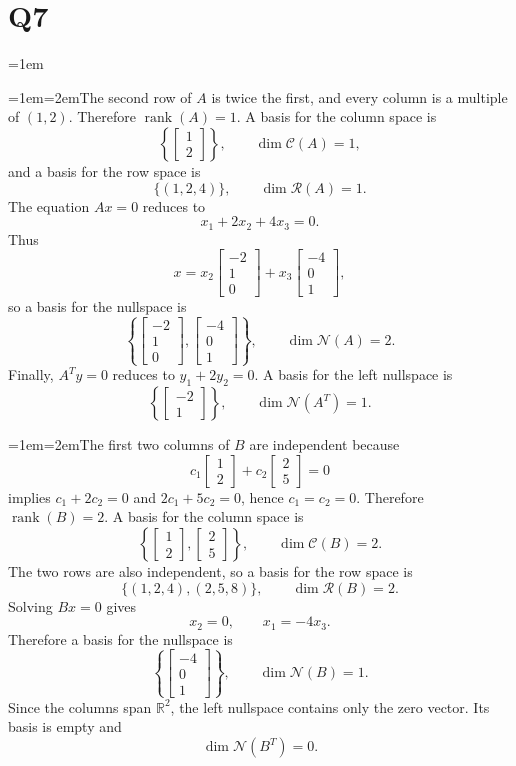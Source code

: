 \documentclass[11pt]{article}
\newcommand{\solutionquestion}[1]{\par\leftskip=0pt\section*{Q#1}\leftskip=1em}
\newcommand{\solutionpart}[1]{\par\smallskip\leftskip=1em\noindent\hangindent=2em\hangafter=1\makebox[1.5em][l]{\textbf{(#1)}}\hspace{0.5em}\ignorespaces}
\begin{document}
\newpage
\solutionquestion{7}
\solutionpart{i}The second row of $A$ is twice the first, and every column is a multiple of $(1,2)$. Therefore $\operatorname{rank}(A)=1$. A basis for the column space is
\[
\left\{\begin{bmatrix}1\\2\end{bmatrix}\right\},
\qquad \dim\mathcal C(A)=1,
\]
and a basis for the row space is
\[
\{(1,2,4)\},
\qquad \dim\mathcal R(A)=1.
\]
The equation $Ax=0$ reduces to
\[
x_1+2x_2+4x_3=0.
\]
Thus
\[
x=
x_2\begin{bmatrix}-2\\1\\0\end{bmatrix}
+x_3\begin{bmatrix}-4\\0\\1\end{bmatrix},
\]
so a basis for the nullspace is
\[
\left\{
\begin{bmatrix}-2\\1\\0\end{bmatrix},
\begin{bmatrix}-4\\0\\1\end{bmatrix}
\right\},
\qquad \dim\mathcal N(A)=2.
\]
Finally, $A^{T}y=0$ reduces to $y_1+2y_2=0$. A basis for the left nullspace is
\[
\left\{\begin{bmatrix}-2\\1\end{bmatrix}\right\},
\qquad \dim\mathcal N(A^{T})=1.
\]

\solutionpart{ii}The first two columns of $B$ are independent because
\[
c_1\begin{bmatrix}1\\2\end{bmatrix}
+c_2\begin{bmatrix}2\\5\end{bmatrix}=0
\]
implies $c_1+2c_2=0$ and $2c_1+5c_2=0$, hence $c_1=c_2=0$. Therefore $\operatorname{rank}(B)=2$. A basis for the column space is
\[
\left\{
\begin{bmatrix}1\\2\end{bmatrix},
\begin{bmatrix}2\\5\end{bmatrix}
\right\},
\qquad \dim\mathcal C(B)=2.
\]
The two rows are also independent, so a basis for the row space is
\[
\{(1,2,4),(2,5,8)\},
\qquad \dim\mathcal R(B)=2.
\]
Solving $Bx=0$ gives
\[
x_2=0,
\qquad x_1=-4x_3.
\]
Therefore a basis for the nullspace is
\[
\left\{\begin{bmatrix}-4\\0\\1\end{bmatrix}\right\},
\qquad \dim\mathcal N(B)=1.
\]
Since the columns span $\mathbb R^2$, the left nullspace contains only the zero vector. Its basis is empty and
\[
\dim\mathcal N(B^{T})=0.
\]
\end{document}
